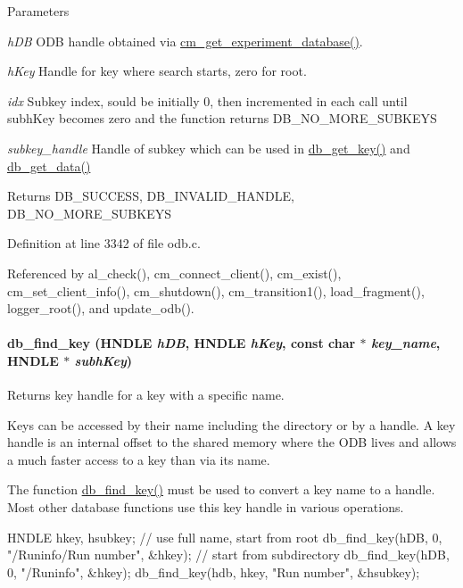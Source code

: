 \begin{DoxyParams}{Parameters}
\item[{\em hDB}]ODB handle obtained via \hyperlink{group__cmfunctionc_ga16b33b70783a3f5ba98b4094149d12b7}{cm\_\-get\_\-experiment\_\-database()}. \item[{\em hKey}]Handle for key where search starts, zero for root. \item[{\em idx}]Subkey index, sould be initially 0, then incremented in each call until subhKey becomes zero and the function returns DB\_\-NO\_\-MORE\_\-SUBKEYS \item[{\em subkey\_\-handle}]Handle of subkey which can be used in \hyperlink{group__odbfunctionc_ga424ad3b166e3fba9bae29f7dfc74a369}{db\_\-get\_\-key()} and \hyperlink{group__odbfunctionc_ga8d8bb0ee338e5fbc46fed2c29e697540}{db\_\-get\_\-data()} \end{DoxyParams}
\begin{DoxyReturn}{Returns}
DB\_\-SUCCESS, DB\_\-INVALID\_\-HANDLE, DB\_\-NO\_\-MORE\_\-SUBKEYS 
\end{DoxyReturn}


Definition at line 3342 of file odb.c.

Referenced by al\_\-check(), cm\_\-connect\_\-client(), cm\_\-exist(), cm\_\-set\_\-client\_\-info(), cm\_\-shutdown(), cm\_\-transition1(), load\_\-fragment(), logger\_\-root(), and update\_\-odb().
\paragraph[{db\_\-find\_\-key}]{ db\_\-find\_\-key (HNDLE {\em hDB}, \/  HNDLE {\em hKey}, \/  const char $\ast$ {\em key\_\-name}, \/  HNDLE $\ast$ {\em subhKey})}\hfill\label{group__odbfunctionc_ga321df44195a9cbc83dbf10e32e32fd5b}
Returns key handle for a key with a specific name.

Keys can be accessed by their name including the directory or by a handle. A key handle is an internal offset to the shared memory where the ODB lives and allows a much faster access to a key than via its name.

The function \hyperlink{group__odbfunctionc_ga321df44195a9cbc83dbf10e32e32fd5b}{db\_\-find\_\-key()} must be used to convert a key name to a handle. Most other database functions use this key handle in various operations. 
\begin{DoxyCode}
HNDLE hkey, hsubkey;
// use full name, start from root
db_find_key(hDB, 0, "/Runinfo/Run number", &hkey);
// start from subdirectory
db_find_key(hDB, 0, "/Runinfo", &hkey);
db_find_key(hdb, hkey, "Run number", &hsubkey);
\end{DoxyCode}
 
